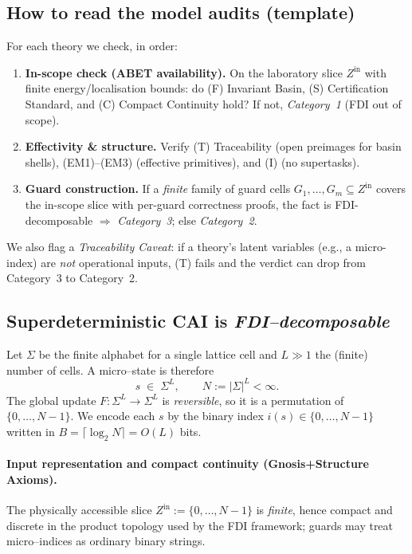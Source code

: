 \documentclass[12pt]{article}
\theoremstyle{definition}
\theoremstyle{plain}
\begin{document}
\subsection*{How to read the model audits (template)}
For each theory we check, in order:
\begin{enumerate}[leftmargin=1.25em,itemsep=2pt]
  \item \textbf{In-scope check (ABET availability).} On the laboratory slice $Z^{\mathrm{in}}$ with finite energy/localisation bounds: do (F) Invariant Basin, (S) Certification Standard, and (C) Compact Continuity hold? If not, \emph{Category~1} (FDI out of scope).
  \item \textbf{Effectivity \& structure.} Verify (T) Traceability (open preimages for basin shells), (EM1)–(EM3) (effective primitives), and (I) (no supertasks).
  \item \textbf{Guard construction.} If a \emph{finite} family of guard cells $G_1,\dots,G_m\subseteq Z^{\mathrm{in}}$ covers the in-scope slice with per-guard correctness proofs, the fact is FDI-decomposable $\Rightarrow$ \emph{Category~3}; else \emph{Category~2}.
\end{enumerate}
We also flag a \emph{Traceability Caveat}: if a theory’s latent variables (e.g., a micro-index) are \emph{not} operational inputs, (T) fails and the verdict can drop from Category~3 to Category~2.


\subsection{Superdeterministic CAI is
            \emph{FDI–decomposable}}
\label{subsec:cai-decomposable}

Let $\Sigma$ be the finite alphabet for a single lattice cell and
$L\gg1$ the (finite) number of cells.  A micro–state is therefore
%
\[
   s \;\in\; \Sigma^{L}, 
   \qquad N:=|\Sigma|^{L}<\infty.
\]
%
The global update $F\colon\Sigma^{L}\!\to\Sigma^{L}$ is \emph{reversible},
so it is a permutation of $\{0,\dots,N-1\}$.  We encode each $s$ by the
binary index $i(s)\in\{0,\dots,N-1\}$ written in
$B=\lceil\log_2 N\rceil=O(L)$ bits.

\paragraph{Input representation and compact continuity (Gnosis+Structure Axioms).}
The physically accessible slice
$Z^{\mathrm{in}}:=\{0,\dots,N-1\}$ is \emph{finite}, hence compact and
discrete in the product topology used by the FDI framework; guards may
treat micro–indices as ordinary binary strings.
\end{document}
